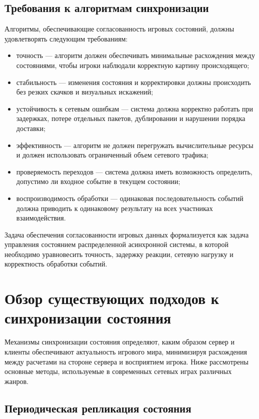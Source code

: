 \subsection{Требования к алгоритмам синхронизации}

Алгоритмы, обеспечивающие согласованность игровых состояний, должны удовлетворять следующим требованиям:
\begin{itemize}
	\item точность --- алгоритм должен обеспечивать минимальные расхождения между состояниями, чтобы игроки наблюдали корректную картину происходящего;
	\item стабильность --- изменения состояния и корректировки должны происходить без резких скачков и визуальных искажений;
	\item устойчивость к сетевым ошибкам --- система должна корректно работать при задержках, потере отдельных пакетов, дублировании и нарушении порядка доставки;
	\item эффективность --- алгоритм не должен перегружать вычислительные ресурсы и должен использовать ограниченный объем сетевого трафика;
	\item проверяемость переходов --- система должна иметь возможность определить, допустимо ли входное событие в текущем состоянии;
	\item воспроизводимость обработки --- одинаковая последовательность событий должна приводить к одинаковому результату на всех участниках взаимодействия.
\end{itemize}

Задача обеспечения согласованности игровых данных формализуется как задача управления состоянием распределенной асинхронной системы, в которой необходимо уравновесить точность, задержку реакции, сетевую нагрузку и корректность обработки событий.

\section{Обзор существующих подходов к синхронизации состояния}

Механизмы синхронизации состояния определяют, каким образом сервер и клиенты обеспечивают актуальность игрового мира, минимизируя расхождения между расчетами на стороне сервера и восприятием игрока. Ниже рассмотрены основные методы, используемые в современных сетевых играх различных жанров.

\subsection{Периодическая репликация состояния}

